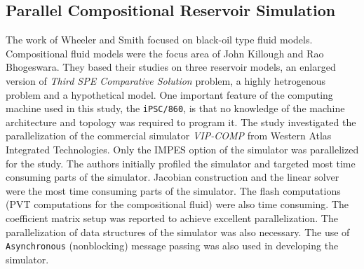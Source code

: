 \documentclass[barcolor=BrickRed,nocopyright,nolists]{asmejour}
\begin{document}
\subsection{Parallel Compositional Reservoir Simulation}
The work of Wheeler and Smith focused on black-oil type fluid models. Compositional fluid models were the focus area of John Killough and Rao Bhogeswara\cite{spe21208}. They based their studies on
three reservoir models, an enlarged version of \textit{Third SPE Comparative Solution} problem, a highly hetrogenous problem and a hypothetical model. One important feature of the computing machine used in this study, the \texttt{iPSC/860}, is that no knowledge of the
machine architecture and topology was required to program it. The study investigated the parallelization of the commercial simulator \textit{VIP-COMP} from Western Atlas Integrated Technologies. Only the IMPES option of the simulator was parallelized for the study. 
The authors initially profiled the simulator and targeted most time consuming parts of the simulator. Jacobian construction and the linear solver were the most time consuming parts of the simulator. 
The flash computations (PVT computations for the compositional fluid) were also time consuming. The coefficient matrix setup was reported to achieve excellent parallelization. The parallelization of data structures of the simulator was also necessary.
The use of \texttt{Asynchronous} (nonblocking) message passing was also used in developing the simulator.
\end{document}
